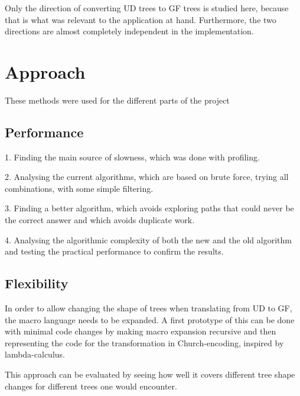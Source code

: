 \documentclass{article}
\begin{document}
Only the direction of converting UD trees to GF trees is studied here, because that is what was relevant to the application at hand. Furthermore, the two directions are almost completely independent in the implementation.



%




\section{Approach}

These methods were used for the different parts of the project

\subsection{Performance}

1. Finding the main source of slowness, which was done with profiling.

2. Analysing the current algorithms, which are based on brute force, trying all combinations, with some simple filtering.

3. Finding a better algorithm, which avoids exploring paths that could never be the correct answer and which avoids duplicate work.

4. Analysing the algorithmic complexity of both the new and the old algorithm and testing the practical performance to confirm the results.

\subsection{Flexibility}

In order to allow changing the shape of trees when translating from UD to GF, the macro language needs to be expanded.
A first prototype of this
can be done with minimal code changes by making macro expansion recursive and then representing the code for the transformation in Church-encoding, inspired by lambda-calculus.

This approach can be evaluated by seeing how well it covers different tree shape changes for different trees one would encounter.
\end{document}
